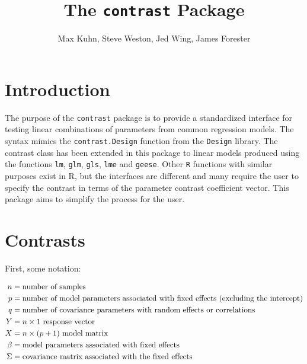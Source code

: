 \documentclass[12pt]{article}
\title{The \texttt{contrast} Package}
\author{Max Kuhn, Steve Weston, Jed Wing, James Forester}
\newcommand{\contrast}{{\tt contrast}\xspace}
\begin{document}
\maketitle

\thispagestyle{empty}
	
\section{Introduction}

The purpose of the \contrast package is to provide a standardized interface for testing linear combinations of parameters from common regression models. The syntax mimics the \texttt{contrast.Design} function from the \texttt{Design} library. The contrast class has been extended in this package to linear models produced using the functions \texttt{lm}, \texttt{glm}, \texttt{gls}, \texttt{lme} and \texttt{geese}. Other \texttt{R} functions with similar purposes exist in R, but the interfaces are different and many require the user to specify the contrast in terms of the parameter contrast coefficient vector. This package aims to simplify the process for the user.

\section{Contrasts}

First, some notation:

\begin{align}
   n &= \text{number of samples} \notag \\
   p &= \text{number of model parameters associated with fixed effects (excluding the intercept)} \notag \\
   q &= \text{number of covariance parameters with random effects or correlations } \notag \\
   Y &= \text{$n\times 1$ response vector} \notag \\
   X &= \text{$n\times (p+1)$ model matrix} \notag \\
   \beta &= \text{model parameters associated with fixed effects} \notag \\
   \Sigma &= \text{covariance matrix associated with the fixed effects} \notag \\
\end{align}
\end{document}
